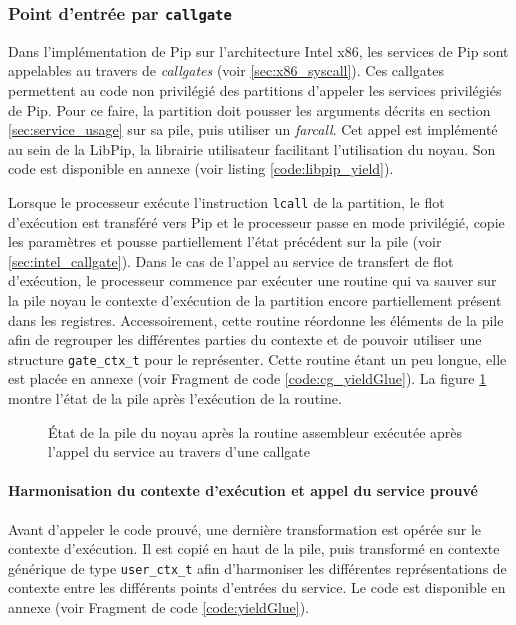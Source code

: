 			\subsubsection{Point d'entrée par \texttt{callgate}}

		Dans l'implémentation de Pip sur l'architecture Intel x86, les services de Pip sont appelables au travers de \emph{callgates} (voir \ref{sec:x86_syscall}). Ces callgates permettent au code non privilégié des partitions d'appeler les services privilégiés de Pip.
		Pour ce faire, la partition doit pousser les arguments décrits en section \ref{sec:service_usage} sur sa pile, puis utiliser un \emph{farcall}. Cet appel est implémenté au sein de la LibPip, la librairie utilisateur facilitant l'utilisation du noyau. Son code est disponible en annexe (voir listing \ref{code:libpip_yield}).

		Lorsque le processeur exécute l'instruction \texttt{lcall} de la partition, le flot d'exécution est transféré vers Pip et le processeur passe en mode privilégié, copie les paramètres et pousse partiellement l'état précédent sur la pile (voir \ref{sec:intel_callgate}). Dans le cas de l'appel au service de transfert de flot d'exécution, le processeur commence par exécuter une routine qui va sauver sur la pile noyau le contexte d'exécution de la partition encore partiellement présent dans les registres. Accessoirement, cette routine réordonne les éléments de la pile afin de regrouper les différentes parties du contexte et de pouvoir utiliser une structure \texttt{gate\_ctx\_t} pour le représenter. Cette routine étant un peu longue, elle est placée en annexe (voir Fragment de code \ref{code:cg_yieldGlue}).
		La figure \ref{fig:cg_stack} montre l'état de la pile après l'exécution de la routine.

		\begin{figure}[!ht]
			
			\caption{État de la pile du noyau après la routine assembleur exécutée après l'appel du service au travers d'une callgate}
			\label{fig:cg_stack}
		\end{figure}
	
		\paragraph{Harmonisation du contexte d'exécution et appel du service prouvé} \label{sec:context_harmonisation} Avant d'appeler le code prouvé, une dernière transformation est opérée sur le contexte d'exécution. Il est copié en haut de la pile, puis transformé en contexte générique de type \texttt{user\_ctx\_t} afin d'harmoniser les différentes représentations de contexte entre les différents points d'entrées du service. Le code est disponible en annexe (voir Fragment de code \ref{code:yieldGlue}).

